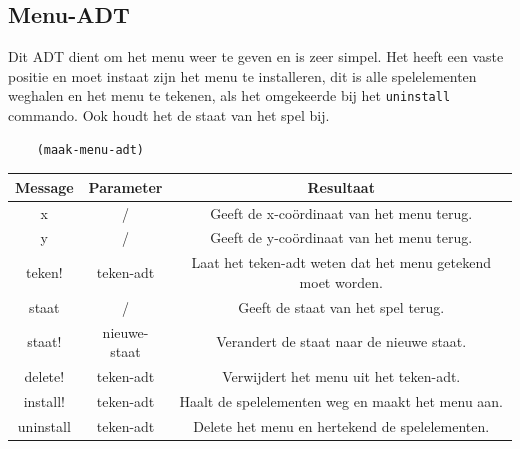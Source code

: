 \documentclass[]{article}
\begin{document}
\subsection{Menu-ADT}
Dit ADT dient om het menu weer te geven en is zeer simpel. Het heeft een vaste positie en moet instaat zijn het menu te installeren, dit is alle spelelementen weghalen en het menu te tekenen, als het omgekeerde bij het \texttt{uninstall} commando. Ook houdt het de staat van het spel bij. \\
\begin{center}
	\begin{lstlisting}
	(maak-menu-adt)
	\end{lstlisting}
	\begin{tabular}{|c|c|c|}
		\hline  \textbf{Message} &\textbf{Parameter} & \textbf{Resultaat}  \\
		\hline x & /&Geeft de x-co\"{o}rdinaat van het menu terug. \\
		\hline y & /&Geeft de y-co\"{o}rdinaat van het menu terug. \\
		\hline teken! &teken-adt& Laat het teken-adt weten dat het menu getekend moet worden. \\
		\hline staat & / & Geeft de staat van het spel terug. \\
		\hline staat! & nieuwe-staat & Verandert de staat naar de nieuwe staat.	\\
		\hline delete! & teken-adt & Verwijdert het menu uit het teken-adt. \\
		\hline install! & teken-adt & Haalt de spelelementen weg en maakt het menu aan. \\
		\hline uninstall& teken-adt & Delete het menu en hertekend de spelelementen. \\
		\hline 
	\end{tabular}
\end{center}
\end{document}
